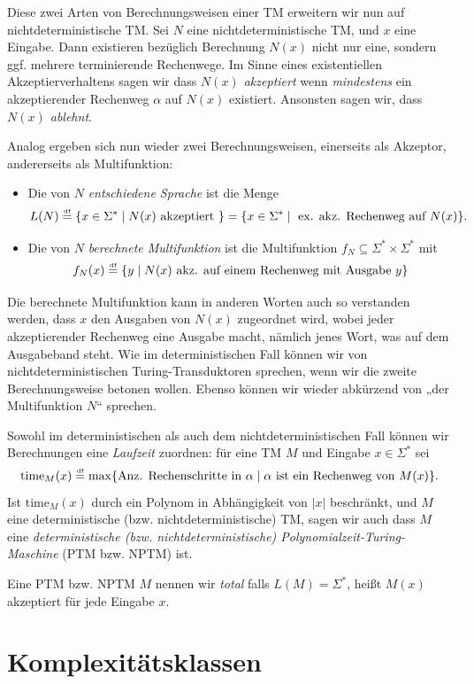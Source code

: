 Diese zwei Arten von Berechnungsweisen einer TM erweitern wir nun auf nichtdeterministische TM. 
Sei  $N$ eine nichtdeterministische TM, und $x$ eine Eingabe. Dann existieren bezüglich Berechnung $N(x)$ nicht nur eine, sondern ggf. mehrere terminierende Rechenwege. 
Im Sinne eines existentiellen Akzeptierverhaltens sagen wir dass \emph{$N(x)$ akzeptiert} wenn \emph{mindestens} ein akzeptierender Rechenweg $\alpha$ auf $N(x)$ existiert.
Ansonsten sagen wir, dass \emph{$N(x)$ ablehnt}.


Analog ergeben sich nun wieder zwei Berechnungsweisen, einerseits als Akzeptor, andererseits als Multifunktion:
\begin{itemize}
    \item Die von $N$ \emph{entschiedene  Sprache} ist die Menge \[ L(N)\stackrel{\text{\smash{\tiny df}}}{=}\{ x\in\Sigma^* \mid N(x) \text{ akzeptiert } \} = \{ x\in\Sigma^* \mid \text{ ex. akz. Rechenweg auf $N(x)$} \}. \]
    \item Die von $N$ \emph{berechnete Multifunktion} ist die Multifunktion $f_N\subseteq\Sigma^*\times\Sigma^*$ mit
        \[ f_N(x) \stackrel{\text{\smash{\tiny df}}}{=} \{ y \mid \text{$N(x)$ akz. auf einem Rechenweg mit Ausgabe $y$} \}  \] 
\end{itemize}
Die berechnete Multifunktion kann in anderen Worten auch so verstanden werden, dass $x$ den Ausgaben von $N(x)$ zugeordnet wird, wobei jeder akzeptierender Rechenweg eine Ausgabe macht, nämlich jenes Wort, was auf dem Ausgabeband steht.
Wie im deterministischen Fall können wir von nichtdeterministischen Turing-Transduktoren sprechen, wenn wir die zweite Berechnungsweise betonen wollen. Ebenso können wir wieder abkürzend von „der Multifunktion $N$“ sprechen.

Sowohl im deterministischen als auch dem nichtdeterministischen Fall können wir Berechnungen eine \emph{Laufzeit} zuordnen: für eine TM $M$ und Eingabe $x\in\Sigma^*$ sei
\[ \mathrm{time}_M(x) \stackrel{\text{\smash{\tiny df}}}{=} \max \{ \text{Anz. Rechenschritte in $\alpha$} \mid \text{$\alpha$ ist ein Rechenweg von $M(x)$}  \}. \]
Ist $\mathrm{time}_M(x)$ durch ein Polynom in Abhängigkeit von $|x|$ beschränkt, und $M$ eine deterministische (bzw. nichtdeterministische) TM, sagen wir auch dass $M$ eine \emph{deterministische (bzw. nichtdeterministische) Polynomialzeit-Turing-Maschine} (PTM bzw. NPTM) ist. 

Eine PTM bzw. NPTM $M$ nennen wir \emph{total} falls $L(M)=\Sigma^*$, heißt $M(x)$ akzeptiert für jede Eingabe $x$.


\section{Komplexitätsklassen}\label{sec:prelim-klassen}

